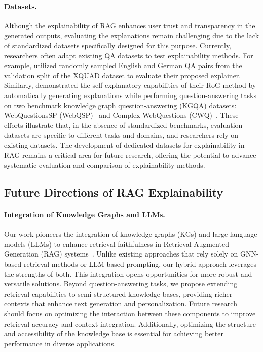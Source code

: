 \paragraph{Datasets.}
Although the explainability of RAG enhances user trust and transparency in the generated outputs, evaluating the explanations remain challenging due to the lack of standardized datasets specifically designed for this purpose. Currently, researchers often adapt existing QA datasets to test explainability methods. For example, \citet{sudhi2024rag} utilized randomly sampled English and German QA pairs from the validation split of the XQUAD dataset to evaluate their proposed explainer. Similarly, \citet{luo2024rog} demonstrated the self-explanatory capabilities of their RoG method by automatically generating explanations while performing question-answering tasks on two benchmark knowledge graph question-answering (KGQA) datasets: WebQuestionsSP (WebQSP)~\cite{yih2016value} and Complex WebQuestions (CWQ)~\cite{talmor2018web}. These efforts illustrate that, in the absence of standardized benchmarks, evaluation datasets are specific to different tasks and domains, and researchers rely on existing datasets. The development of dedicated datasets for explainability in RAG remains a critical area for future research, offering the potential to advance systematic evaluation and comparison of explainability methods.




\subsection{Future Directions of RAG Explainability}
\paragraph{Integration of Knowledge Graphs and LLMs.} Our work pioneers the integration of knowledge graphs (KGs) and large language models (LLMs) to enhance retrieval faithfulness in Retrieval-Augmented Generation (RAG) systems~\cite{ni2024trustworthyknowledgegraphreasoning}. Unlike existing approaches that rely solely on GNN-based retrieval methods or LLM-based prompting, our hybrid approach leverages the strengths of both. This integration opens opportunities for more robust and versatile solutions. Beyond question-answering tasks, we propose extending retrieval capabilities to semi-structured knowledge bases, providing richer contexts that enhance text generation and personalization. Future research should focus on optimizing the interaction between these components to improve retrieval accuracy and context integration. Additionally, optimizing the structure and accessibility of the knowledge base is essential for achieving better performance in diverse applications.

